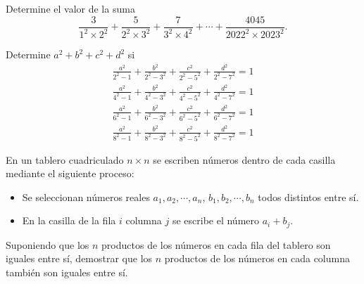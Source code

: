 \begin{section-problem}
    Determine el valor de la suma
    \[\frac{3}{1^2\times 2^2} + \frac{5}{2^2\times 3^2} + \frac{7}{3^2\times 4^2} + \cdots + \frac{4045}{2022^2\times 2023^2}.\]
\end{section-problem}

\begin{section-problem}
    Determine $a^2 + b^2 + c^2 + d^2$ si
    \begin{gather*}
        \frac{a^2}{2^2 - 1} + \frac{b^2}{2^2 - 3^2} + \frac{c^2}{2^2 - 5^2} + \frac{d^2}{2^2 - 7^2} = 1\\
        \frac{a^2}{4^2 - 1} + \frac{b^2}{4^2 - 3^2} + \frac{c^2}{4^2 - 5^2} + \frac{d^2}{4^2 - 7^2} = 1\\
        \frac{a^2}{6^2 - 1} + \frac{b^2}{6^2 - 3^2} + \frac{c^2}{6^2 - 5^2} + \frac{d^2}{6^2 - 7^2} = 1\\
        \frac{a^2}{8^2 - 1} + \frac{b^2}{8^2 - 3^2} + \frac{c^2}{8^2 - 5^2} + \frac{d^2}{8^2 - 7^2} = 1
    \end{gather*}
\end{section-problem}

\begin{section-problem}
    En un tablero cuadriculado $n \times n$ se escriben números dentro de cada casilla mediante el siguiente proceso:
    \begin{itemize}
        \item Se seleccionan números reales $a_1, a_2, \cdots, a_n$, $b_1, b_2, \cdots, b_n$ todos distintos entre sí.
        \item En la casilla de la fila $i$ columna $j$ se escribe el número $a_i + b_j$.
    \end{itemize}
    Suponiendo que los $n$ productos de los números en cada fila del tablero son iguales entre sí, demostrar que los $n$ productos de los números en cada columna también son iguales entre sí.
\end{section-problem}

